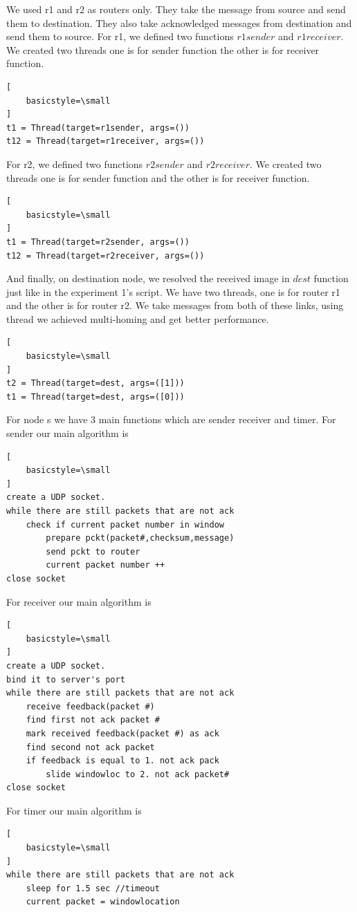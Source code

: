 \documentclass[conference]{IEEEtran}
\begin{document}
We used r1 and r2 as routers only. They take the message from source and send them to destination. They also take acknowledged messages from destination and send them to source. For r1, we defined two functions $r1sender$ and $r1receiver$. We created two threads one is for sender function the other is for receiver function.
\begin{lstlisting}[
    basicstyle=\small
]
t1 = Thread(target=r1sender, args=())
t12 = Thread(target=r1receiver, args=())
\end{lstlisting}
For r2, we defined two functions $r2sender$ and $r2receiver$. We created two threads one is for sender function and the other is for receiver function.
\begin{lstlisting}[
    basicstyle=\small
]
t1 = Thread(target=r2sender, args=())
t12 = Thread(target=r2receiver, args=())
\end{lstlisting}
And finally, on destination node, we resolved the received image in $dest$ function just like in the experiment 1's script. We have two threads, one is for router r1 and the other is for router r2. We take messages from both of these links, using thread we achieved multi-homing and get better performance.
\begin{lstlisting}[
    basicstyle=\small
]
t2 = Thread(target=dest, args=([1]))
t1 = Thread(target=dest, args=([0]))
\end{lstlisting}

For  node s we have 3 main functions which are sender receiver and timer. For sender our main algorithm is 
\begin{lstlisting}[
    basicstyle=\small
]
create a UDP socket.
while there are still packets that are not ack
    check if current packet number in window
        prepare pckt(packet#,checksum,message)
        send pckt to router
        current packet number ++
close socket
\end{lstlisting}
For receiver our main algorithm is 
\begin{lstlisting}[
    basicstyle=\small
]
create a UDP socket.
bind it to server's port
while there are still packets that are not ack
    receive feedback(packet #)
    find first not ack packet #
    mark received feedback(packet #) as ack
    find second not ack packet
    if feedback is equal to 1. not ack pack
        slide windowloc to 2. not ack packet#
close socket
\end{lstlisting}
For timer our main algorithm is 
\begin{lstlisting}[
    basicstyle=\small
]
while there are still packets that are not ack
    sleep for 1.5 sec //timeout
    current packet = windowlocation
\end{lstlisting}
\end{document}
